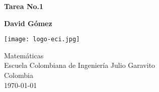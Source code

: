 \documentclass{article}
\begin{document}
\begin{titlepage}
	\begin{center}
		\vspace*{1cm}

		\textbf{\Large{Tarea No.1}}

		\vspace{1.5cm}

		\textbf{David Gómez}

		\vspace{5cm}

		\texttt{[image: logo-eci.jpg]}

		\vspace{5cm}

		Matemáticas\\
		Escuela Colombiana de Ingeniería Julio Garavito\\
		Colombia\\
		\today

	\end{center}
\end{titlepage}
\end{document}
